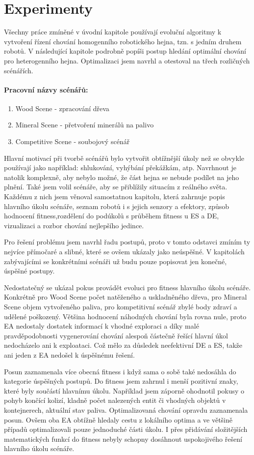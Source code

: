 \chapter{Experimenty}
Všechny práce zmíněné v úvodní kapitole používají evoluční algoritmy k vytvoření řízení chování homogenního robotického hejna, tzn. s jedním druhem robotů. V následující kapitole podrobně popíši postup hledání optimální chování pro heterogenního hejna. Optimalizaci jsem navrhl a otestoval na třech rozličných scénářích. 
\par
\subsubsection{Pracovní názvy scénářů:}
\begin{enumerate}
	\item Wood Scene - zpracování dřeva
	\item Mineral Scene - přetvoření minerálů na palivo 
	\item Competitive Scene - soubojový scénář
\end{enumerate}

Hlavní motivací při tvorbě scénářů bylo vytvořit obtížnější úkoly než se obvykle používají jako například: shlukování, vyhýbání překážkám, atp. Navrhnout je natolik komplexně, aby nebylo možné, že část hejna se nebude podílet na jeho plnění. Také jsem volil scénáře, aby se přiblížily situacím z reálného světa. Každému z nich jsem věnoval samostatnou kapitolu, která zahrnuje popis hlavního úkolu scénáře, seznam robotů i s jejich senzory a efektory, způsob hodnocení fitness,rozdělení do podúkolů s průběhem fitness u ES a DE, vizualizaci a rozbor chování nejlepšího jedince.  
\par
Pro řešení problému jsem navrhl řadu postupů, proto v tomto odstavci zmíním ty nejvíce přímočaré a slibné, které se ovšem ukázaly  jako neúspěšné. V kapitolách zabývajícími se konkrétními scénáři už budu pouze popisovat jen konečné, úspěšné postupy.
 \par
Nedostatečný se ukázal pokus provádět evoluci pro fitness hlavního úkolu scénáře. Konkrétně pro Wood Scene počet natěženého a uskladněného dřeva, pro Mineral Scene objem vytvořeného paliva, pro kompetitivní scénář zbylé body zdraví a udělené poškozený. Většina hodnocení náhodných chování byla rovna nule, proto EA nedostaly dostatek informací k vhodné exploraci a díky malé pravděpodobnosti vygenerování chování alespoň částečně řešící hlavní úkol nedocházelo ani k exploataci. Což mělo za důsledek neefektivní  DE a ES, takže ani jeden z EA nedošel k úspěšnému řešení. 
\par
Posun zaznamenala více obecná fitness i když sama o sobě také nedosáhla do kategorie úspěšných postupů. Do fitness jsem zahrnul i menší pozitivní znaky, které byly součástí hlavnímu úkolu. Například jsem záporně ohodnotil pokusy o pohyb končící kolizí, kladně počet nalezených entit či vhodných objektů v kontejnerech, aktuální stav paliva. Optimalizovaná chování opravdu zaznamenala posun. Ovšem oba EA obtížně hledaly cestu z lokálního optima a ve většině případů optimalizovali pouze jednoduché části úkolu. I přes přidávání složitějších matematických funkcí do fitness nebyly schopny dosáhnout uspokojivého řešení hlavního úkolu scénáře.  
